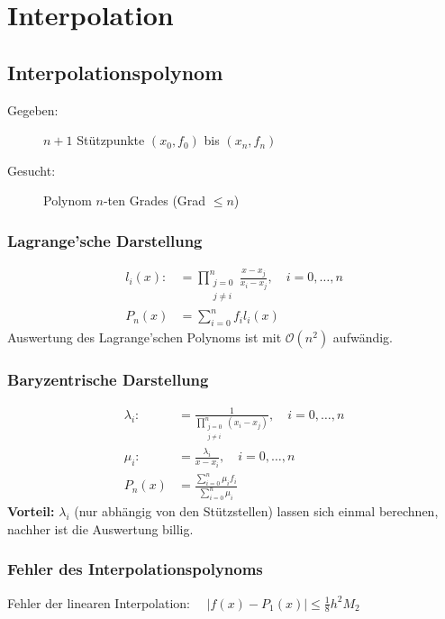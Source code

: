 \section{Interpolation}
	\subsection{Interpolationspolynom}
		\begin{description}
			\item[Gegeben:] $n+1$ Stützpunkte $(x_0,f_0)$ bis $(x_n,f_n)$
			\item[Gesucht:] Polynom $n$-ten Grades (Grad $\leq n$)
		\end{description}

		\subsubsection{Lagrange'sche Darstellung}
			\begin{align*}
				l_i(x) :&= \prod_{\substack{
					j=0 \\ j \neq i
				}}^n \frac{x-x_j}{x_i - x_j}, \quad i= 0, \dots, n \\
				P_n(x) &= \sum_{i=0}^{n}f_i l_i(x)
			\end{align*}
			Auswertung des Lagrange'schen Polynoms ist mit $\mathcal{O}(n^2)$ aufwändig.

		\subsubsection{Baryzentrische Darstellung}
			\begin{align*}
				\lambda_i :&= \frac{1}{\prod_{\substack{
					j=0 \\ j \neq i
				}}^n (x_i-x_j)}, \quad i= 0, \dots , n \\
				\mu_i :&= \frac{\lambda_i}{x-x_i},\quad i= 0, \dots , n \\
				P_n(x) &= \frac{\sum_{i=0}^n \mu_i f_i}{\sum_{i=0}^n \mu_i}
			\end{align*}
			\textbf{Vorteil:} $\lambda_i$ (nur abhängig von den Stützstellen) lassen sich einmal berechnen, nachher ist die Auswertung billig.

		\subsubsection{Fehler des Interpolationspolynoms}
			Fehler der linearen Interpolation: $\displaystyle\quad |f(x) - P_1(x)| \leq \frac{1}{8}h^2M_2$

